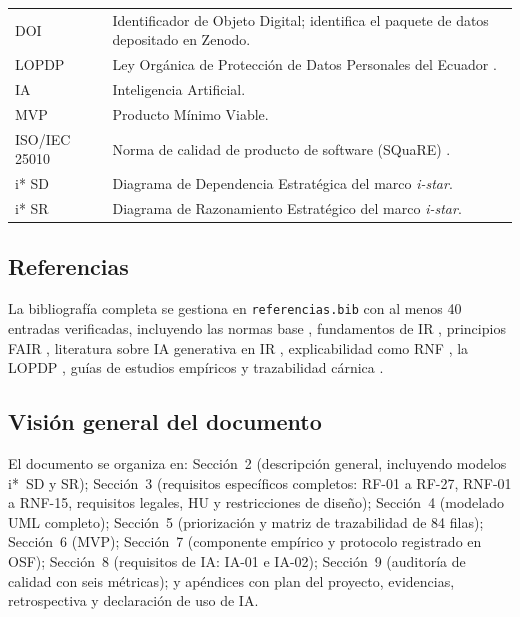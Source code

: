 \documentclass[11pt,a4paper]{article}
\begin{document}
\begin{longtable}{|p{3.5cm}|p{11cm}|}
DOI & Identificador de Objeto Digital; identifica el paquete de datos depositado en Zenodo. \\
LOPDP & Ley Orgánica de Protección de Datos Personales del Ecuador \cite{lopd2021}. \\
IA & Inteligencia Artificial. \\
MVP & Producto Mínimo Viable. \\
ISO/IEC 25010 & Norma de calidad de producto de software (SQuaRE) \cite{iso25010}. \\
i* SD & Diagrama de Dependencia Estratégica del marco \textit{i-star}. \\
i* SR & Diagrama de Razonamiento Estratégico del marco \textit{i-star}. \\
\hline
\end{longtable}

\subsection{Referencias}

La bibliografía completa se gestiona en \texttt{referencias.bib} con al menos 40 entradas verificadas, incluyendo las normas base \cite{iso29148,iso25010}, fundamentos de IR \cite{pohl2010,swebok2024}, principios FAIR \cite{wilkinson2016fair}, literatura sobre IA generativa en IR \cite{cheng2026genai,arora2024genai,vogelsang2024llm}, explicabilidad como RNF \cite{chazette2020explainability,chazette2021exploring,chazette2022explainable}, la LOPDP \cite{lopd2021}, guías de estudios empíricos \cite{molleri2020checklist,hennink2017saturation,runeson2009casestudy,wohlin2012experimentation,nosek2018preregistration,cohen1960kappa,fleiss1971kappa,ferrari2016ambiguity,fischbach2023acceptance,kitchenham2007slr} y trazabilidad cárnica \cite{chen2021blockchain,beck2021blockchainmeat}.

\subsection{Visión general del documento}

El documento se organiza en: Sección~2 (descripción general, incluyendo modelos i*~SD y SR); Sección~3 (requisitos específicos completos: RF-01 a RF-27, RNF-01 a RNF-15, requisitos legales, HU y restricciones de diseño); Sección~4 (modelado UML completo); Sección~5 (priorización y matriz de trazabilidad de 84 filas); Sección~6 (MVP); Sección~7 (componente empírico y protocolo registrado en OSF); Sección~8 (requisitos de IA: IA-01 e IA-02); Sección~9 (auditoría de calidad con seis métricas); y apéndices con plan del proyecto, evidencias, retrospectiva y declaración de uso de IA.
\end{document}
